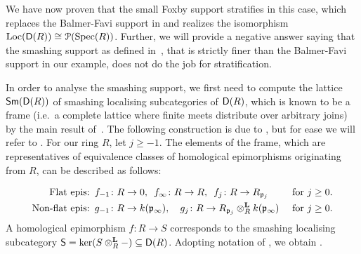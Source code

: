 \documentclass[reqno,a4paper]{amsart}
\begin{document}
\begin{example}
    We have now proven that the small Foxby support stratifies in this case, which replaces  the Balmer-Favi support in  and realizes the isomorphism $\operatorname{Loc}(\mathsf{D}(R))\cong\mathcal{P}(\operatorname{Spec}(R))$.
    Further, we will provide a negative answer saying that the smashing support as defined in~\cite[\S3.2]{bigspectra}, that is strictly finer than the Balmer-Favi support in our example, does not do the job for stratification.

    In order to analyse the smashing support, we first need to compute the lattice $\mathsf{Sm}(\mathsf{D}(R))$ of smashing localising subcategories of $\mathsf{D}(R)$, which is known to be a frame (i.e.\ a complete lattice where finite meets distribute over arbitrary joins) by the main result of~\cite{bks20}.
    The following construction is due to \cite[\S5]{gldm1}, but for ease we will refer to \cite[Construction 3.3, Theorem 3.4]{bt25}. For our ring $R$, let $j\ge-1$. The elements of the frame, which are representatives of equivalence classes of homological epimorphisms originating from $R$, can be described as follows:

    \begin{eqnarray}\label{eqn:epis}
    \begin{split}
              \mbox{Flat epis:}\enspace &f_{-1}\colon R\to 0,\enspace f_\infty\colon R\to R, \enspace f_j\colon R\to R_{\mathfrak{p}_j} &\mbox{ for }j\ge0.\\
        \mbox{Non-flat epis:}\enspace&g_{-1}\colon R\to k(\mathfrak{p}_\infty),\enspace\enspace g_j\colon R\to R_{\mathfrak{p}_j}\otimes^\mathbf{L}_R k(\mathfrak{p}_\infty) &\mbox{ for }j\ge0.  
    \end{split}
    \end{eqnarray}
    A homological epimorphism $f\colon R\to S$ corresponds to the smashing localising subcategory $\mathsf{S}=\ker(S\otimes^\mathbf{L}_R-)\subseteq\mathsf{D}(R)$. Adopting notation of \cite[\S 4.1]{bt25},
    we obtain .
\begin{figure}[h]
\begin{center}
\begin{tikzcd}[style={every outer matrix/.append style={draw=black, inner xsep=6pt , inner ysep=9pt, rounded corners, very thick}},row sep=0.3cm,column sep=0.9cm]


\end{tikzcd}
\end{center}
\end{figure}
\end{example}
\end{document}
